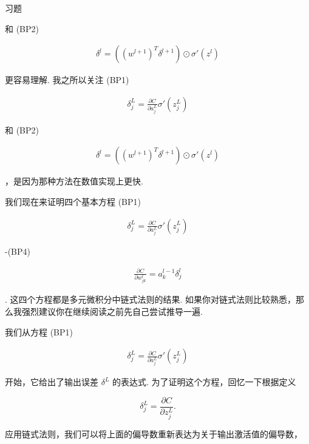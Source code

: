\begin{exerciseBox}{习题}
\begin{itemize}
和 (BP2)

\begin{align*}
\delta^l = ((w^{l+1})^T \delta^{l+1}) \odot \sigma'(z^l) \nonumber
\end{align*}

更容易理解. 我之所以关注 (BP1)

\begin{align*}
\delta^L_j = \frac{\partial C}{\partial a^L_j} \sigma'(z^L_j) \nonumber
\end{align*}

和 (BP2)

\begin{align*}
\delta^l = ((w^{l+1})^T \delta^{l+1}) \odot \sigma'(z^l) \nonumber
\end{align*}

，是因为那种方法在数值实现上更快.

\end{itemize}

\end{exerciseBox}

我们现在来证明四个基本方程 (BP1)

\begin{align*}
\delta^L_j = \frac{\partial C}{\partial a^L_j} \sigma'(z^L_j) \nonumber
\end{align*}

\noindent -(BP4)

\begin{align*}
\frac{\partial C}{\partial w^l_{jk}} = a^{l-1}_k \delta^l_j \nonumber
\end{align*}

\noindent. 这四个方程都是多元微积分中链式法则的结果. 如果你对链式法则比较熟悉，那么我强烈建议你在继续阅读之前先自己尝试推导一遍.

我们从方程 (BP1)

\begin{align*}
\delta^L_j = \frac{\partial C}{\partial a^L_j} \sigma'(z^L_j) \nonumber
\end{align*}

\noindent 开始，它给出了输出误差 $\delta^L$ 的表达式. 为了证明这个方程，回忆一下根据定义

\begin{equation}
\delta^L_j = \frac{\partial C}{\partial z^L_j}.
\tag{36}
\end{equation}

\noindent 应用链式法则，我们可以将上面的偏导数重新表达为关于输出激活值的偏导数，

